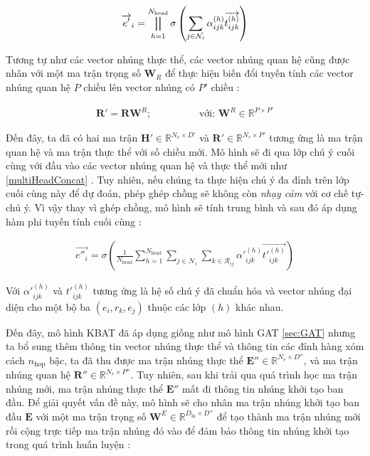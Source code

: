 \begin{align}
\overrightarrow{e'}_i=\bigparallel_{h=1}^{N_{\text{head}}} \sigma\left(\sum_{j\in \mathcal{N}_i}\alpha_{ijk}^{(h)} \overrightarrow{t^{(h)}_{ijk}}\right)
\end{align}

Tương tự như các vector nhúng thực thể, các vector nhúng quan hệ cũng được nhân với một ma trận trọng số $\mathbf{W}_R$ để thực hiện biến đổi tuyến tính các vector nhúng quan hệ $P$ chiều lên vector nhúng có $P'$ chiều :

\begin{align}
\mathbf{R'} = \mathbf{R} \mathbf{W}^R; \hspace{2cm} \text{với: } \mathbf{W}^R \in \mathbb{R}^{P \times P'}
\end{align}

Đến đây, ta đã có hai ma trận $\mathbf{H}' \in \mathbb{R}^{N_e \times D'}$ và $\mathbf{R}' \in \mathbb{R}^{N_r \times P'}$ tương ứng là ma trận quan hệ và ma trận thực thể với số chiều mới. Mô hình sẽ đi qua lớp chú ý cuối cùng với đầu vào các vector nhúng quan hệ và thực thể mới như \ref{multiHeadConcat} . Tuy nhiên, nếu chúng ta thực hiện chú ý đa đỉnh trên lớp cuối cùng này để dự đoán, phép ghép chồng sẽ không còn \textit{nhạy cảm} với cơ chế tự-chú ý. Vì vậy thay vì ghép chồng, mô hình sẽ tính trung bình và sau đó áp dụng hàm phi tuyến tính cuối cùng :

\begin{align}
\label{eq:multiHeadRelationAttention}
\overrightarrow{e''_{i}}=\sigma\left(\frac{1}{N_{\text{head}}} \sum_{h=1}^{N_{\text{head}}} \sum_{j \in \mathcal{N}_i} \sum_{k \in \mathcal{R}_{ij}} \alpha'^{(h)}_{ijk} \overrightarrow{t'^{(h)}_{ijk}} \right)
\end{align}

Với $\alpha'^{(h)}_{ijk}$ và $t'^{(h)}_{ijk}$ tương ứng là hệ số chú ý đã chuẩn hóa và vector nhúng đại diện cho một bộ ba $(e_i, r_k, e_j)$ thuộc các lớp $(h)$ khác nhau.


Đến đây, mô hình KBAT đã áp dụng giống như mô hình GAT \ref{sec:GAT} nhưng ta bổ sung thêm thông tin vector nhúng thực thể và thông tin các đỉnh hàng xóm cách $n_{\text{hop}}$ bậc, ta đã thu được ma trận nhúng thực thể $\mathbf{E}'' \in \mathbb{R}^{N_e \times D''}$, và ma trận nhúng quan hệ $\mathbf{R}'' \in \mathbb{R}^{N_r \times P''}$. Tuy nhiên, sau khi trải qua quá trình học ma trận nhúng mới, ma trận nhúng thực thể $\mathbf{E}''$ mất đi thông tin nhúng khởi tạo ban đầu. Để giải quyết vấn đề này, mô hình sẽ cho nhân ma trận nhúng khởi tạo ban đầu $\mathbf{E}$ với một ma trận trọng số $\mathbf{W}^E \in \mathbb{R}^{D_{\text{in}} \times D''}$ để tạo thành ma trận nhúng mới rồi cộng trực tiếp ma trận nhúng đó vào để đảm bảo thông tin nhúng khởi tạo trong quá trình huấn luyện :


